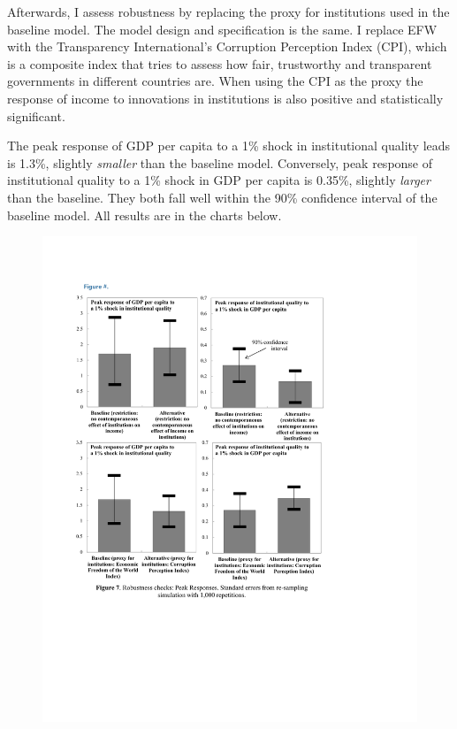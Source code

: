 \documentclass{article}
\begin{document}
Afterwards, I assess robustness by replacing the proxy for institutions used in the baseline model. The model design and specification is the same. I replace EFW with the Transparency International's Corruption Perception Index (CPI), which is a composite index that tries to assess how fair, trustworthy and transparent governments in different countries are. When using the CPI as the proxy the response of income to innovations in institutions is also positive and statistically significant. 

The peak response of GDP per capita to a 1\% shock in institutional quality leads is 1.3\%, slightly \textit{smaller} than the baseline model. Conversely, peak response of institutional quality to a 1\% shock in GDP per capita is 0.35\%, slightly \textit{larger} than the baseline. They both fall well within the 90\% confidence interval of the baseline model. All results are in the charts below.

\begin{figure}[ht]
\begin{center}
    \includegraphics[scale=0.8]{robustness.pdf}
\end{center}
\end{figure}
\end{document}

